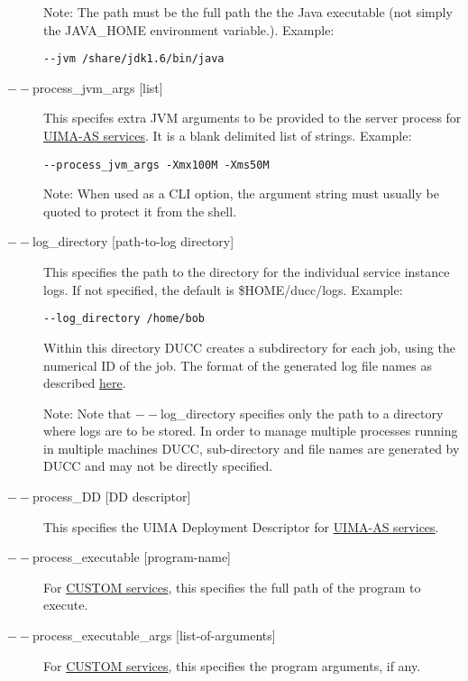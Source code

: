 \begin{description}
          Note: The path must be the full path the the Java executable (not 
          simply the JAVA\_HOME environment variable.).  Example:
\begin{verbatim}
--jvm /share/jdk1.6/bin/java 
\end{verbatim}


        \item[$--$process\_jvm\_args {[list]} ]        
          This specifes extra JVM arguments to be provided to the server process for
          \hyperref[sec:services.types]{UIMA-AS services}. It is a blank delimited 
            list of strings. Example: 
\begin{verbatim}
--process_jvm_args -Xmx100M -Xms50M
\end{verbatim}

          Note: When used as a CLI option, the argument string must usually be quoted to protect
          it from the shell.
    
          \item[$--$log\_directory {[path-to-log directory]}] This specifies the path to the directory for
            the individual service instance logs. If not specified, the default is \$HOME/ducc/logs. Example:
\begin{verbatim}
--log_directory /home/bob 
\end{verbatim}
        
        Within this directory DUCC creates a subdirectory for each job, using the numerical 
        ID of the job. The format of the generated log file names as described
        \hyperref[chap:job-logs]{here}.
        
        Note: Note that $--$log\_directory specifies only the path to a directory where 
        logs are to be stored. In order to manage multiple processes running in multiple 
        machines DUCC, sub-directory and file names are generated by DUCC and may 
        not be directly specified. 

      \item[$--$process\_DD {[DD descriptor]}] 
        This specifies the UIMA Deployment Descriptor for \hyperref[sec:services.types]{UIMA-AS services}.

      \item[$--$process\_executable {[program-name]}] For \hyperref[sec:services.types]{CUSTOM
          services}, this specifies the full path of the program to execute.

      \item[$--$process\_executable\_args {[list-of-arguments]}] For \hyperref[sec:services.types]{CUSTOM
          services}, this specifies the program arguments, if any.


\end{description}
